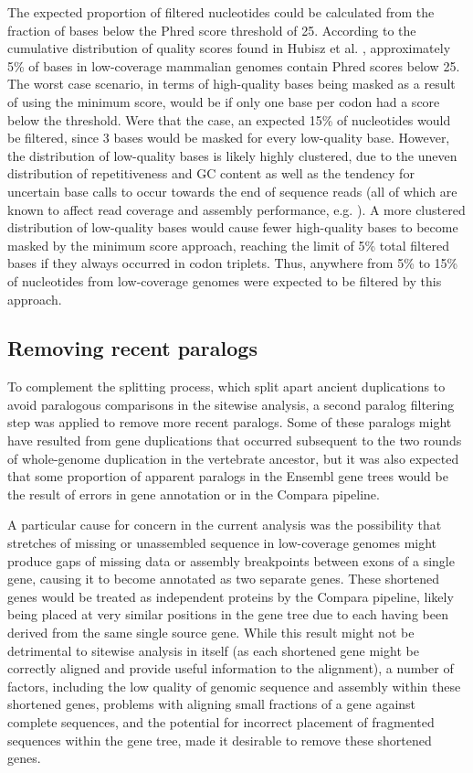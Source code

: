 The expected proportion of filtered nucleotides could be calculated from
the fraction of bases below the Phred score threshold of 25. According
to the cumulative distribution of quality scores found in Hubisz et
al. \citeyearpar{Hubisz2011}, approximately 5\% of bases in low-coverage
mammalian genomes contain Phred scores below 25. The worst case
scenario, in terms of high-quality bases being masked as a result of
using the minimum score, would be if only one base per codon had a
score below the threshold. Were that the case, an expected 15\% of
nucleotides would be filtered, since 3 bases would be masked for every
low-quality base. However, the distribution of low-quality bases is
likely highly clustered, due to the uneven distribution of
repetitiveness and GC content as well as the tendency for uncertain
base calls to occur towards the end of sequence reads (all of which
are known to affect read coverage and assembly performance,
e.g. \cite{Teytelman2009}). A more clustered
distribution of low-quality bases would cause fewer high-quality bases
to become masked by the minimum score approach, reaching the limit of
5\% total filtered bases if they always occurred in codon
triplets. Thus, anywhere from 5\% to 15\% of nucleotides from
low-coverage genomes were expected to be filtered by this approach.

\subsection{Removing recent paralogs}

To complement the \subtr{} splitting process, which split apart
ancient duplications to avoid paralogous comparisons in the sitewise
analysis, a second paralog filtering step was applied to remove more
recent paralogs. Some of these paralogs might have resulted from gene
duplications that occurred subsequent to the two rounds of
whole-genome duplication in the vertebrate ancestor, but it was also
expected that some proportion of apparent paralogs in the Ensembl gene
trees would be the result of errors in gene annotation or in the
Compara pipeline.

A particular cause for concern in the current analysis was the
possibility that stretches of missing or unassembled sequence in
low-coverage genomes might produce gaps of missing data or assembly
breakpoints between exons of a single gene, causing it to become
annotated as two separate genes. These shortened genes would be
treated as independent proteins by the Compara pipeline, likely being
placed at very similar positions in the gene tree due to each having
been derived from the same single source gene. While this result might
not be detrimental to sitewise analysis in itself (as each shortened
gene might be correctly aligned and provide useful information to the
alignment), a number of factors, including the low quality of genomic
sequence and assembly within these shortened genes, problems with
aligning small fractions of a gene against complete sequences, and the
potential for incorrect placement of fragmented sequences within the
gene tree, made it desirable to remove these shortened genes.

